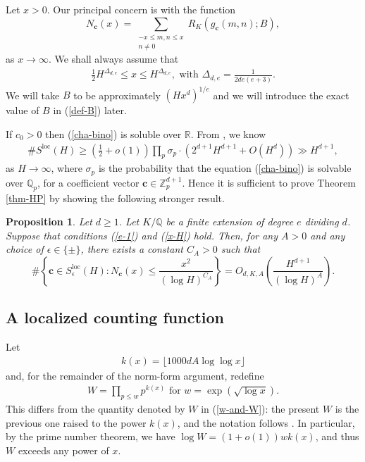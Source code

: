 \documentclass[reqno, 11pt]{amsart}
\renewcommand{\leq}{\leqslant}
\renewcommand{\geq}{\geqslant}
\newtheorem{prop}[theorem]{Proposition}
\theoremstyle{definition}
\theoremstyle{definition}
\renewcommand{\geq}{\geqslant}
\renewcommand{\leq}{\leqslant}
\newcommand{\RR}{\mathbb{R}}
\newcommand{\cc}{\mathbf{c}}
\newcommand{\QQ}{\mathbb{Q}}
\newcommand{\ZZ}{\mathbb{Z}}
\numberwithin{equation}{section}
\begin{document}
Let $x > 0$. Our principal concern is with the function 
$$N_{\cc}(x) = \sum_{\substack{-x \leq m, n \leq x \\ n \neq 0}} R_K(g_{\cc}(m,n); B),$$
as $x \rightarrow \infty$.
We shall always assume that
\begin{align}\label{x-H}
   \frac{1}{2}H^{\Delta_{d,e}} \leq  x \leq H^{\Delta_{d,e}}, \text{ with } \Delta_{d,e} = \frac{1}{2de(e+3)}.
\end{align}
We will take $B$ to be approximately $(Hx^d)^{1/e}$ and we will introduce the exact value of $B$ in (\ref{def-B}) later.

If $c_0 > 0$ then (\ref{cha-bino}) is soluble over $\RR$. From \cite[Theorem 1.4]{BBL}, we know
\begin{align}\label{Thm-BBL}
	\#S^{\mathrm{loc}}(H) \geq \left( \frac{1}{2} + o(1) \right) \prod_p \sigma_p \cdot \left( 2^{d+1} H^{d+1} + O(H^d) \right) \gg H^{d+1},
\end{align}
as $H \rightarrow \infty$, where $\sigma_p$ is the probability that the equation (\ref{cha-bino}) is solvable over $\QQ_p$, for a coefficient vector $\cc \in \ZZ_p^{d+1}$.
Hence it is sufficient to prove Theorem \ref{thm-HP} by showing the following stronger result.
\begin{prop}\label{thm-cha}
Let $d \geq 1$. Let $K/\QQ$ be a finite extension of degree $e$ dividing $d$. Suppose that conditions (\ref{e-1}) and (\ref{x-H}) hold. Then, for any $A > 0$ and any choice of $\epsilon \in \{\pm\}$, there exists a constant $C_A > 0$ such that
	$$\#\left\{\cc \in S_\epsilon^{\mathrm{loc}}(H): N_\cc(x) \leq \frac{x^2}{(\log H)^{C_A}} \right\} = O_{d,K,A} \left( \frac{ H^{d+1}}{(\log H)^{A}} \right).$$
\end{prop}



\subsection{A localized counting function}

Let 
\begin{align}\label{def-kx}
	k(x) = \lfloor 1000dA \log \log x \rfloor
\end{align}
and, for the remainder of the norm-form argument, redefine
\begin{align}\label{def-W}
	W = \prod_{p \leq w} p^{k(x)} \text{ \ for \ } w =\exp (\sqrt{\log x}).
\end{align}
This differs from the quantity denoted by $W$ in (\ref{w-and-W}): the present $W$ is the previous one raised to the power $k(x)$, and the notation follows \cite[\S 7]{BST}. In particular, by the prime number theorem, we have $\log W = (1 + o(1)) w k(x)$, and thus $W$ exceeds any power of $x$.
\end{document}

